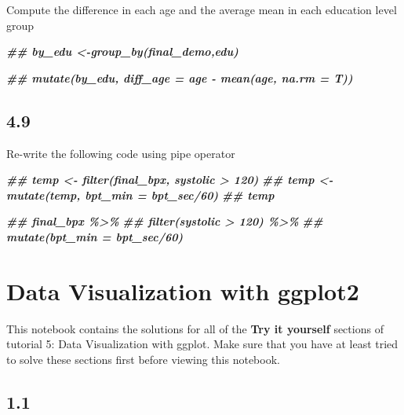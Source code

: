 \documentclass[
]{book}
\newenvironment{Shaded}{\begin{snugshade}}{\end{snugshade}}
\newcommand{\DocumentationTok}[1]{\textcolor[rgb]{0.56,0.35,0.01}{\textbf{\textit{#1}}}}
\begin{document}
Compute the difference in each age and the average mean in each education level group

\begin{Shaded}
\begin{Highlighting}[]
\DocumentationTok{\#\# by\_edu \textless{}{-}group\_by(final\_demo,edu)}

\DocumentationTok{\#\# mutate(by\_edu, diff\_age = age {-} mean(age, na.rm = T))}
\end{Highlighting}
\end{Shaded}

\hypertarget{section-27}{%
\subsection{4.9}\label{section-27}}

Re-write the following code using pipe operator

\begin{Shaded}
\begin{Highlighting}[]
\DocumentationTok{\#\# temp \textless{}{-} filter(final\_bpx, systolic \textgreater{} 120)}
\DocumentationTok{\#\# temp \textless{}{-} mutate(temp, bpt\_min = bpt\_sec/60)}
\DocumentationTok{\#\# temp}
\end{Highlighting}
\end{Shaded}

\begin{Shaded}
\begin{Highlighting}[]
\DocumentationTok{\#\# final\_bpx \%\textgreater{}\%}
\DocumentationTok{\#\#    filter(systolic \textgreater{} 120) \%\textgreater{}\%}
\DocumentationTok{\#\#    mutate(bpt\_min = bpt\_sec/60)}
\end{Highlighting}
\end{Shaded}

\hypertarget{data-visualization-with-ggplot2-1}{%
\section{Data Visualization with ggplot2}\label{data-visualization-with-ggplot2-1}}

This notebook contains the solutions for all of the \textbf{Try it yourself} sections of tutorial 5: Data Visualization with ggplot. Make sure that you have at least tried to solve these sections first before viewing this notebook.

\hypertarget{section-28}{%
\subsection{1.1}\label{section-28}}
\end{document}
